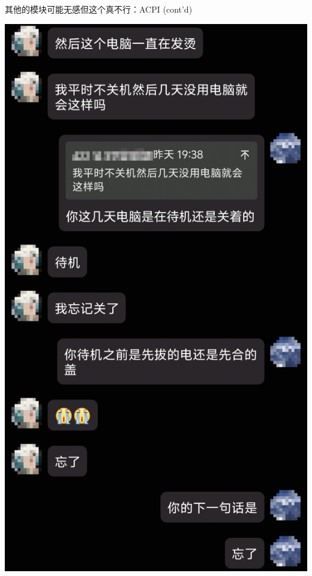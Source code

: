\documentclass[aspectratio=1610]{beamer}
\begin{document}
\begin{frame}{其他的模块可能无感但这个真不行：ACPI (cont'd)}
\begin{minipage}{0.25\linewidth}
        \includegraphics[width=\linewidth]{pic/123.png}
    \end{minipage}
    \begin{minipage}{0.25\linewidth}
        \flushright

\end{minipage}
\end{frame}
\end{document}
